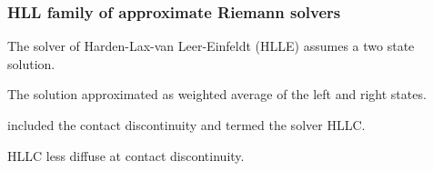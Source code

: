\documentclass{beamer}
\begin{document}
\begin{frame}[fragile]

\end{frame}

\begin{frame}[fragile]
\frametitle{HLL family of approximate Riemann solvers}
\bei
\item The solver of Harden-Lax-van Leer-Einfeldt (HLLE) \citep{Einfeldt:1988} assumes a two state solution.
\item The solution approximated as weighted average of the left and right states.
\pause
\item \citet{Toro:1994} included the contact discontinuity and termed the solver HLLC.
\pause
\item HLLC less diffuse at contact discontinuity.
\ebi
\end{frame}
\end{document}
